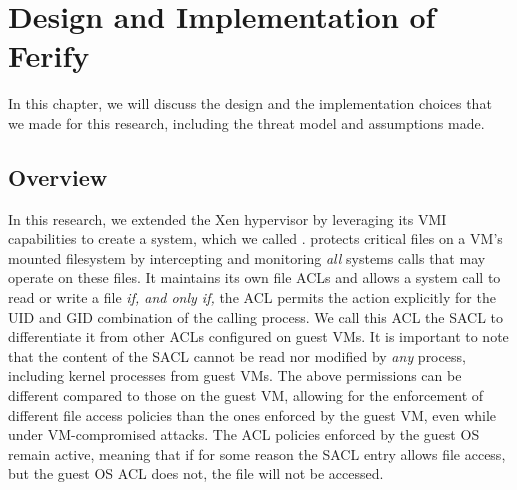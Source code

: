 {}

\chapter{Design and Implementation of Ferify}\label{ch:chapter3}

In this chapter, we will discuss the design and the implementation choices that we made for this research, including the threat model and assumptions made.

\section{Overview}\label{sec:overview}

\par In this research, we extended the Xen hypervisor by leveraging its \ac{VMI} capabilities to create a system, which we called .  protects critical files on a \ac{VM}'s mounted filesystem by intercepting and monitoring \emph{all} systems calls that may operate on these files. It maintains its own file \acp{ACL} and allows a system call to read or write a file \emph{if, and only if,} the \ac{ACL} permits the action explicitly for the \ac{UID} and \ac{GID} combination of the calling process. We call this \ac{ACL} the \ac{SACL} to differentiate it from other \acp{ACL} configured on guest \acp{VM}. It is important to note that the content of the \ac{SACL} cannot be read nor modified by \emph{any} process, including kernel processes from guest \acp{VM}. The above permissions can be different compared to those on the guest \ac{VM}, allowing for the enforcement of different file access policies than the ones enforced by the guest \ac{VM}, even while under \ac{VM}-compromised attacks. The \ac{ACL} policies enforced by the guest \ac{OS} remain active, meaning that if for some reason the \ac{SACL} entry allows file access, but the guest \ac{OS} \ac{ACL} does not, the file will not be accessed.

